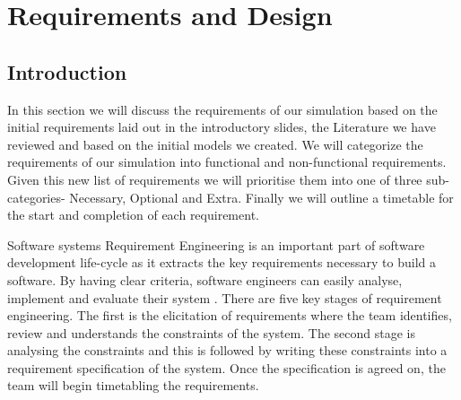 \documentclass{article}
\begin{document}
%	

\section{Requirements and Design}\label{RequirementsAndDeisgn}

\subsection{Introduction}
	In this section we will discuss the requirements of our simulation based on the initial requirements laid out in the introductory slides, the Literature we have reviewed and based on the initial models we created. We will categorize the requirements of our simulation into functional and non-functional requirements. Given this new list of requirements we will prioritise them into one of three sub-categories- Necessary, Optional and Extra. Finally we will outline a timetable for the start and completion of each requirement.  
	
	 Software systems Requirement Engineering is an important part of software development life-cycle as it extracts the key requirements necessary to build a software. By having clear criteria, software engineers can easily analyse, implement and evaluate their system \cite{nuseibeh2000requirements}. There are five key stages of requirement engineering. The first is the elicitation of requirements where the team identifies, review and understands the constraints of the system. The second stage is analysing the constraints and this is followed by writing these constraints into a requirement specification of the system. Once the specification is agreed on, the team will begin timetabling the requirements. 
	 
\end{document}
